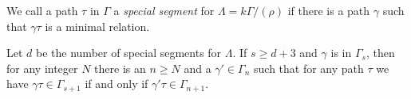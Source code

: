 \begin{defn}
	We call a path $\tau$ in $\Gamma$ a \emph{special segment} for $\Lambda = k\Gamma/(\rho)$ if there is a path $\gamma$ such that $\gamma\tau$ is a minimal relation.
\end{defn}

\begin{prop}
	Let $d$ be the number of special segments for $\Lambda$. If $s \geq d+3$ and $\gamma$ is in $\Gamma_s$, then for any integer $N$ there is an $n \geq N$ and a $\gamma' \in \Gamma_n$ such that for any path $\tau$ we have $\gamma\tau \in \Gamma_{s+1}$ if and only if $\gamma'\tau \in \Gamma_{n+1}$.
\end{prop}
